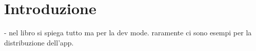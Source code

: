 \chapter{Introduzione}
\label{cap:introduzione}

- nel libro si spiega tutto ma per la dev mode. raramente ci sono esempi per la distribuzione dell'app.